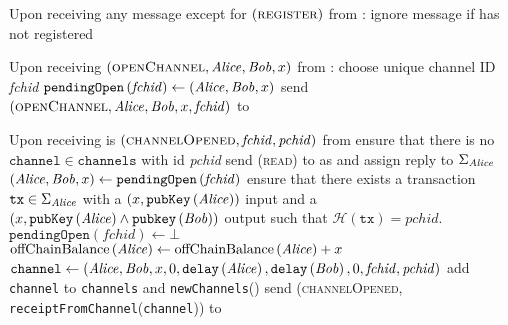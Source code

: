 \begin{functionality}{\fpaynet}
\begin{algorithmic}[1]
    \State Upon receiving any message except for
    $\left(\textsc{register}\right)$ from \alice:
    \Indent
      \State ignore message if \alice has not registered
    \EndIndent
    \State

    \State Upon receiving $\left(\textsc{openChannel}, \mathit{Alice}, \mathit{Bob}, x\right)$
    from \alice:
    \Indent
      \State choose unique channel ID \textit{fchid}
      \State $\mathtt{pendingOpen}\left(\mathit{fchid}\right) \gets \left(\mathit{Alice},
      \mathit{Bob}, x\right)$
      \State send $\left(\textsc{openChannel}, \mathit{Alice}, \mathit{Bob}, x,
      \mathit{fchid}\right)$ to \simulator
    \EndIndent
    \State

    \State Upon receiving is $\left(\textsc{channelOpened}, \mathit{fchid},
    \mathit{pchid}\right)$ from \simulator
    \Indent
      \State ensure that there is no $\mathtt{channel} \in \mathtt{channels}$
      with id \textit{pchid}
      \State send (\textsc{read}) to \ledger{} as \alice{} and assign reply to
      $\Sigma_{\mathit{Alice}}$
      \State $\left(\mathit{Alice}, \mathit{Bob}, x\right) \gets
      \mathtt{pendingOpen}\left(\mathit{fchid}\right)$
      \State ensure that there exists a transaction $\mathtt{tx} \in
      \Sigma_{\mathit{Alice}}$ with a $\left(x,
      \mathtt{pubKey}\left(\mathit{Alice}\right)\right)$ input and a $\left(x,
      \mathtt{pubKey}\left(\mathit{Alice}\right) \wedge
      \mathtt{pubkey}\left(\mathit{Bob}\right)\right)$ output such that
      $\mathcal{H}\left(\mathtt{tx}\right) = \mathit{pchid}$. 
      \State $\mathtt{pendingOpen}\left(\mathit{fchid}\right) \gets \bot$
      \State $\mathrm{offChainBalance}\left(\mathit{Alice}\right) \gets
      \mathrm{offChainBalance}\left(\mathit{Alice}\right) + x$ 
      \State $\mathtt{channel} \gets \left(\mathit{Alice}, \mathit{Bob}, x, 0,
      \mathtt{delay}\left(\mathit{Alice}\right), \mathtt{delay}\left(\mathit{Bob}\right), 0,
      \mathit{fchid}, \mathit{pchid}\right)$
      \State add \texttt{channel} to \texttt{channels} and
      \texttt{newChannels}(\bob)
      \State send (\textsc{channelOpened},
      \texttt{receiptFromChannel}(\texttt{channel})) to \alice
    \EndIndent
    \State


\end{algorithmic}
\end{functionality}
